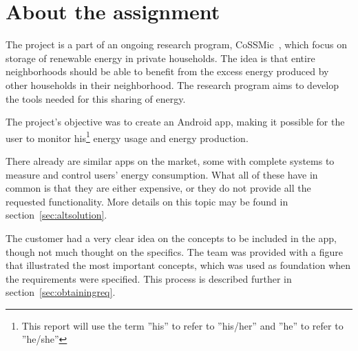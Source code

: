 \section{About the assignment}

The project is a part of an ongoing research program, CoSSMic~\cite{cossmic}, which focus on storage of renewable energy in private households. 
The idea is that entire neighborhoods should be able to benefit from the excess energy produced by other households in their neighborhood. 
The research program aims to develop the tools needed for this sharing of energy. 

The project's objective was to create an Android \gls{app}, making it possible for the user to monitor his\footnote{This report will use the term ''his'' to refer to ''his/her'' and ''he'' to refer to ''he/she''} 
energy usage and energy production. 

There already are similar apps on the market, some with complete systems to measure and control users' energy consumption. 
What all of these have in common is that they are either expensive, or they do not provide all the requested functionality. More details on this topic may be found in section~\ref{sec:altsolution}.

The customer had a very clear idea on the concepts to be included in the app, though not much thought on the specifics. The team was provided with a figure that illustrated the most important concepts, which was used as foundation when the requirements were specified. 
This process is described further in section~\ref{sec:obtainingreq}.